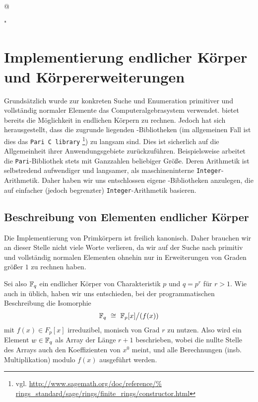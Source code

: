 \lstMakeShortInline[
  basicstyle = \small\normalfont\ttfamily,
  frame = none,
  numberstyle = \tiny,
  breaklines = true,
  escapeinside = {(*}{*)},
  tabsize=3,
  language=C,
  mathescape=true,
  breaklines=true]@

\lstMakeShortInline[
  basicstyle = \small\normalfont\ttfamily,
  frame = none,
  numberstyle = \tiny,
  breaklines = true,
  escapeinside = {(*}{*)},
  tabsize=3,
  language=Python,
  mathescape=true,
  breaklines=true]"

\newcommand{\ttgray}{\color{gray}\ttfamily}


\section{Implementierung endlicher Körper und Körpererweiterungen}
\label{sec:impl_endl_körper}
Grundsätzlich wurde zur konkreten Suche und Enumeration primitiver und
vollständig normaler Elemente das Computeralgebrasystem \sage verwendet.
\sage bietet bereits die Möglichkeit in endlichen Körpern zu rechnen. Jedoch
hat sich herausgestellt, dass die zugrunde liegenden \Clang-Bibliotheken 
(im allgemeinen Fall ist dies das \texttt{Pari C library}%
\footnote{vgl. \url{http://www.sagemath.org/doc/reference/%
rings_standard/sage/rings/finite_rings/constructor.html}}) 
zu langsam sind. Dies ist sicherlich auf die Allgemeinheit ihrer
Anwendungsgebiete zurückzuführen. Beispielsweise arbeitet die 
\texttt{Pari}-Bibliothek stets mit Ganzzahlen beliebiger Größe. Deren
Arithmetik ist selbstredend aufwendiger und langsamer, als maschineninterne
\texttt{Integer}-Arithmetik. Daher haben wir uns entschlossen eigene 
\Clang-Bibliotheken anzulegen, die auf einfacher (jedoch begrenzter) 
\texttt{Integer}-Arithmetik basieren.

\subsection{Beschreibung von Elementen endlicher Körper}
\label{sub:beschreibung_endliche_koerper}
Die Implementierung von Primkörpern ist freilich kanonisch. Daher brauchen wir
an dieser Stelle nicht viele Worte verlieren, da wir auf der Suche nach
primitiv und vollständig normalen Elementen ohnehin nur in Erweiterungen von
Graden größer $1$ zu rechnen haben.

Sei also $\mathbb{F}_q$ ein endlicher Körper von Charakteristik $p$ und $q = p^r$
für $r>1$.
Wie auch in \sage üblich, haben wir uns entschieden, bei der programmatischen
Beschreibung die Isomorphie
\[ \mathbb{F}_q \ \cong\  \mathbb{F}_p[x] \big/ (f(x))\]
mit $f(x) \in F_p[x]$ irreduzibel, monisch von Grad $r$ zu nutzen. 
Also wird ein Element $w \in \mathbb{F}_q$ als Array der Länge $r+1$ beschrieben,
wobei die nullte Stelle des Arrays auch den Koeffizienten von $x^0$ meint, und
alle Berechnungen (insb. Multiplikation) modulo $f(x)$ ausgeführt werden.

